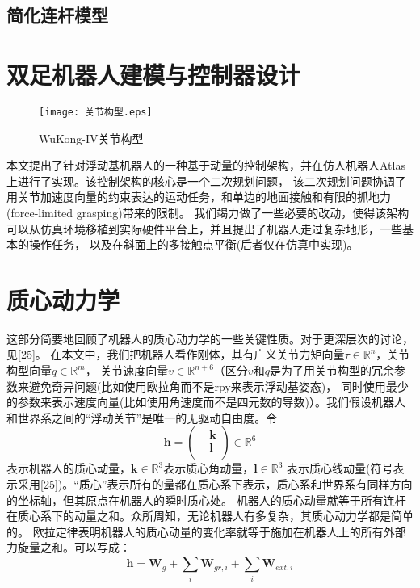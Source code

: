 \subsection{简化连杆模型}

\section{双足机器人建模与控制器设计}
\begin{figure}[htbp]
    \centering
    \texttt{[image: 关节构型.eps]}
    \caption{\label{fig:centroid}WuKong-IV关节构型}
\end{figure}
本文提出了针对浮动基机器人的一种基于动量的控制架构，并在仿人机器人Atlas上进行了实现。该控制架构的核心是一个二次规划问题，
该二次规划问题协调了用关节加速度向量的约束表达的运动任务，和单边的地面接触和有限的抓地力(force-limited grasping)带来的限制。
我们竭力做了一些必要的改动，使得该架构可以从仿真环境移植到实际硬件平台上，并且提出了机器人走过复杂地形，一些基本的操作任务，
以及在斜面上的多接触点平衡(后者仅在仿真中实现)。
\section{质心动力学}
这部分简要地回顾了机器人的质心动力学的一些关键性质。对于更深层次的讨论，见[25]。
在本文中，我们把机器人看作刚体，其有广义关节力矩向量$\tau \in {{\mathbb{R}}^{n}}$，关节构型向量$q\in {{\mathbb{R}}^{m}}$，
关节速度向量$v\in {{\mathbb{R}}^{n+6}}$（区分$v$和$\dot q$是为了用关节构型的冗余参数来避免奇异问题(比如使用欧拉角而不是rpy来表示浮动基姿态)，
同时使用最少的参数来表示速度向量(比如使用角速度而不是四元数的导数)）。我们假设机器人和世界系之间的“浮动关节”是唯一的无驱动自由度。令
\begin{equation}
    \label{equ:momentum}
    \boldsymbol{h}=\left(\begin{aligned}
        & \boldsymbol{k} \\ 
       & \boldsymbol{l} \\ 
      \end{aligned} \right)\in \mathbb{R}^{6}
\end{equation}
表示机器人的质心动量，$\boldsymbol{k}\in {{\mathbb{R}}^{3}}$表示质心角动量，$\boldsymbol{l}\in {{\mathbb{R}}^{3}}$
表示质心线动量(符号表示采用[25])。“质心”表示所有的量都在质心系下表示，质心系和世界系有同样方向的坐标轴，但其原点在机器人的瞬时质心处。
机器人的质心动量就等于所有连杆在质心系下的动量之和。众所周知，无论机器人有多复杂，其质心动力学都是简单的。
欧拉定律表明机器人的质心动量的变化率就等于施加在机器人上的所有外部力旋量之和。可以写成：
\begin{equation}
    \label{equ:euler's_law}
    \dot{\boldsymbol{h}}={{\boldsymbol{W}}_{g}}+\sum\limits_{i}{{{\boldsymbol{W}}_{gr,i}}}+\sum\limits_{i}{{{\boldsymbol{W}}_{ext,i}}}
\end{equation}
	
